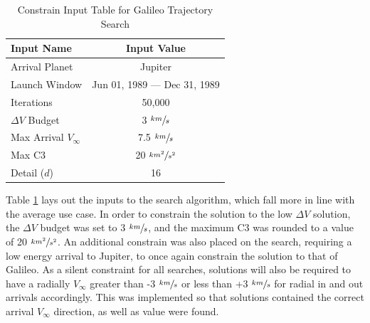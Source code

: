 \documentclass[letterpaper, preprint, paper,11pt]{AAS}	%
\begin{document}
\begin{table}[htb]
    \centering
    \caption{Constrain Input Table for Galileo Trajectory Search}
    \label{table:galiInputs}
    \begin{tabular}{lc}
        \toprule
        \textbf{Input Name} & \textbf{Input Value}\\
        \midrule
        Arrival Planet & Jupiter \\
        Launch Window & Jun 01, 1989 --- Dec 31, 1989 \\
        Iterations & 50,000 \\ 
        $\Delta V$ Budget & 3 $\sfrac{km}{s}$ \\
        Max Arrival $V_{\infty}$ & 7.5 $\sfrac{km}{s}$  \\
        Max C3 & 20 $\sfrac{km^2}{s^2}$ \\
        Detail ($d$) & 16 \\
        \bottomrule
    \end{tabular}
\end{table}

Table \ref*{table:galiInputs} lays out the inputs to the search algorithm, which fall more in line with the average use case. In order to constrain the solution to the low $\Delta V$ solution, the $\Delta V$ budget was set to 3 $\sfrac{km}{s}$, and the maximum C3 was rounded to a value of 20 $\sfrac{km^2}{s^2}$. An additional constrain was also placed on the search, requiring a low energy arrival to Jupiter, to once again constrain the solution to that of Galileo. As a silent constraint for all searches, solutions will also be required to have a radially $V_\infty$ greater than -3 $\sfrac{km}{s}$ or less than +3 $\sfrac{km}{s}$ for radial in and out arrivals accordingly. This was implemented so that solutions contained the correct arrival $V_\infty$ direction, as well as value were found.
\end{document}
